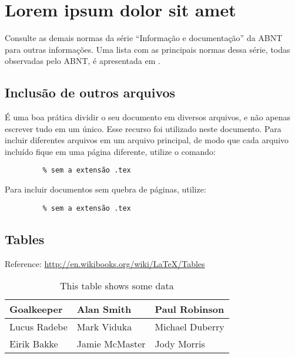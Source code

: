 \chapter{Lorem ipsum dolor sit amet}\label{chp:LABEL_APP_1}

Consulte as demais normas da série ``Informação e documentação'' da ABNT
para outras informações. Uma lista com as principais normas dessa série, todas
observadas pelo ABNT, é apresentada em .

\section{Inclusão de outros arquivos}\label{sec-include}

É uma boa prática dividir o seu documento em diversos arquivos, e não
apenas escrever tudo em um único. Esse recurso foi utilizado neste
documento. Para incluir diferentes arquivos em um arquivo principal,
de modo que cada arquivo incluído fique em uma página diferente, utilize o
comando:

\begin{verbatim}
         % sem a extensão .tex
\end{verbatim}

Para incluir documentos sem quebra de páginas, utilize:

\begin{verbatim}
         % sem a extensão .tex
\end{verbatim}

\section{Tables}\label{sec:LABEL_CHP_2_SEC_A}
Reference: \url{http://en.wikibooks.org/wiki/LaTeX/Tables}

\begin{table}[!h]
  \centering
  \begin{tabular}{ |l|l|l| }
    \hline
      Goalkeeper & Alan Smith & Paul Robinson \\
    \hline
      Lucus Radebe &  Mark Viduka & Michael Duberry \\
    \hline
      Eirik Bakke & Jamie McMaster & Jody Morris \\
    \hline
  \end{tabular}
  \caption{This table shows some data}
  \label{tab:LABEL_TAB_1}
\end{table}

